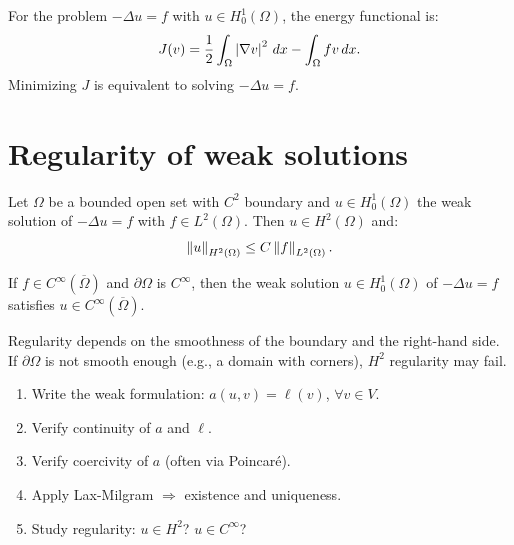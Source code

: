 \begin{example}
For the problem $-\Delta u = f$ with $u \in H_0^1(\Omega)$, the energy functional is:
\[
    J(v) = \frac{1}{2}\int_\Omega \left| \nabla v \right|^2\, dx - \int_\Omega f v\, dx.
\]
Minimizing $J$ is equivalent to solving $-\Delta u = f$.
\end{example}

\section{Regularity of weak solutions}

\begin{theorem}[$H^2$ regularity]
\label{thm:H2_regularity}
Let $\Omega$ be a bounded open set with $C^2$ boundary and $u \in H_0^1(\Omega)$
the weak solution of $-\Delta u = f$ with $f \in L^2(\Omega)$. Then
$u \in H^2(\Omega)$ and:
\[
    \left\| u \right\|_{H^2(\Omega)} \leq C\left\| f \right\|_{L^2(\Omega)}.
\]
\end{theorem}

\begin{theorem}
If $f \in C^\infty(\overline{\Omega})$ and $\partial\Omega$ is $C^\infty$, then
the weak solution $u \in H_0^1(\Omega)$ of $-\Delta u = f$ satisfies
$u \in C^\infty(\overline{\Omega})$.
\end{theorem}

\begin{remark}
Regularity depends on the smoothness of the boundary and the right-hand side. If
$\partial\Omega$ is not smooth enough (e.g., a domain with corners), $H^2$
regularity may fail.
\end{remark}

\begin{keyformulas}[title=\textbf{Summary of the variational method}]
\begin{enumerate}
    \item Write the weak formulation: $a(u,v) = \ell(v)$, $\forall v \in V$.
    \item Verify continuity of $a$ and $\ell$.
    \item Verify coercivity of $a$ (often via Poincar\'e).
    \item Apply Lax-Milgram $\Rightarrow$ existence and uniqueness.
    \item Study regularity: $u \in H^2$? $u \in C^\infty$?
\end{enumerate}
\end{keyformulas}

